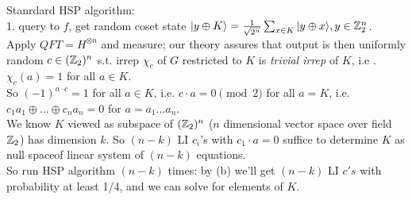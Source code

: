 \documentclass[a4paper]{article}
\begin{document}
Stanrdard HSP algorithm:\\
1. query to $f$, get random coset state $|y \oplus K \rangle = \frac{1}{\sqrt{2^n}} \sum_{x \in K} | y \oplus x\rangle, y \in \mathbb{Z}_2^n$.\\
Apply $QFT=H^{\otimes n}$ and measure; our theory assures that output is then uniformly random $c\in(\mathbb{Z}_2)^n$ s.t. irrep $\chi_c$ of $G$ restricted to $K$ is \emph{trivial irrep} of $K$, i.e .$\chi_c(a) = 1$ for all $a \in K$.\\
So $(-1)^{a \cdot c} = 1$ for all $a \in K$, i.e. $c \cdot a = 0 \pmod 2$ for all $a=K$, i.e. $c_1a_1\oplus ... \oplus c_na_n=0$ for $a=a_1...a_n$.\\
We know $K$ viewed as subspace of $(\mathbb{Z}_2)^n$ ($n$ dimensional vector space over field $\mathbb{Z}_2$) has dimension $k$. So $(n-k)$ LI $c_i$'s with $c_1 \cdot a=0$ suffice to determine $K$ as null spaceof linear system of $(n-k)$ equations.\\
So run HSP algorithm $(n-k)$ times: by (b) we'll get $(n-k)$ LI $c's$ with probability at least 1/4, and we can solve for elements of $K$.
\end{document}
